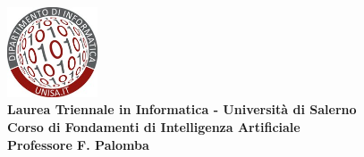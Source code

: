 \documentclass[a4paper,12pt]{article}
\begin{document}
\begin{center}
    \includegraphics[width=0.2\textwidth]{logo.jpg}\\[0.5cm]
    \textbf{\large Laurea Triennale in Informatica - Università di Salerno}\\
    \textbf{\large Corso di Fondamenti di Intelligenza Artificiale}\\
    \textbf{\large Professore F. Palomba}\\[1.5cm]
    \textcolor{titlecolor}{\Huge }
\end{center}

\vspace{-2cm}

\setcounter{tocdepth}{3}
\renewcommand{\contentsname}{\textcolor{blue}{Sommario}}
\tableofcontents

\newpage

\end{document}

